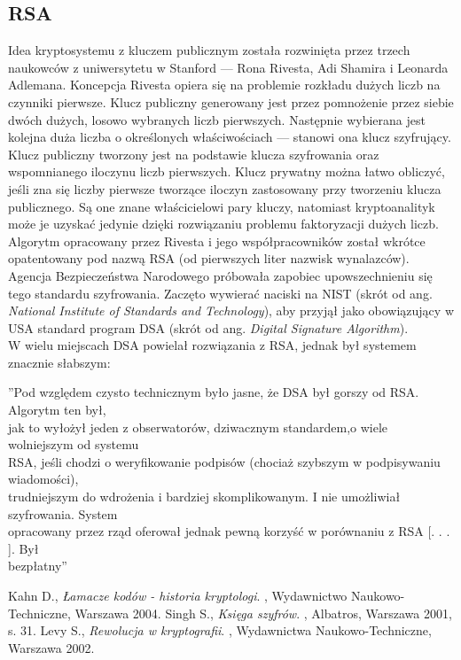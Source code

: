 \documentclass[a4paper]{article}
\begin{document}
\subsection{RSA}
Idea kryptosystemu z kluczem publicznym została rozwinięta przez trzech naukowców z uniwersytetu
w Stanford — Rona Rivesta, Adi Shamira i Leonarda Adlemana. Koncepcja Rivesta opiera
się na problemie rozkładu dużych liczb na czynniki pierwsze. Klucz publiczny generowany jest
przez pomnożenie przez siebie dwóch dużych, losowo wybranych liczb pierwszych. Następnie wybierana
jest kolejna duża liczba o określonych właściwościach — stanowi ona klucz szyfrujący.
Klucz publiczny tworzony jest na podstawie klucza szyfrowania oraz wspomnianego iloczynu liczb
pierwszych. Klucz prywatny można łatwo obliczyć, jeśli zna się liczby pierwsze tworzące iloczyn
zastosowany przy tworzeniu klucza publicznego. Są one znane właścicielowi pary kluczy, natomiast
kryptoanalityk może je uzyskać jedynie dzięki rozwiązaniu problemu faktoryzacji dużych liczb. \\
Algorytm opracowany przez Rivesta i jego współpracowników został wkrótce opatentowany pod
nazwą RSA (od pierwszych liter nazwisk wynalazców). Agencja Bezpieczeństwa Narodowego próbowała
zapobiec upowszechnieniu się tego standardu szyfrowania. Zaczęto wywierać naciski na
NIST (skrót od ang. \textit{National Institute of Standards and Technology}), aby przyjął jako obowiązujący
w USA standard program DSA (skrót od ang. \textit{Digital Signature Algorithm}). \\
W wielu miejscach DSA powielał rozwiązania z RSA, jednak był systemem znacznie słabszym:
\begin{center}
”Pod względem czysto technicznym było jasne, że DSA był gorszy od RSA. Algorytm ten był, \\

jak to wyłożył jeden z obserwatorów, dziwacznym standardem,o wiele wolniejszym od systemu \\

RSA, jeśli chodzi o weryfikowanie podpisów (chociaż szybszym w podpisywaniu wiadomości), \\

trudniejszym do wdrożenia i bardziej skomplikowanym. I nie umożliwiał szyfrowania. System \\

opracowany przez rząd oferował jednak pewną korzyść w porównaniu z RSA [. . . ]. Był \\

bezpłatny”\cite{text3} \\
\end{center}

\begin{thebibliography}{9}
Kahn D.,
\textit{ Łamacze kodów - historia kryptologi}.
, Wydawnictwo Naukowo-Techniczne, Warszawa
2004.
Singh S.,
\textit{Księga szyfrów}.
, Albatros, Warszawa 2001, s. 31.
Levy S.,
\textit{Rewolucja w kryptografii}.
, Wydawnictwa Naukowo-Techniczne, Warszawa 2002.
\end{thebibliography}
\end{document}
